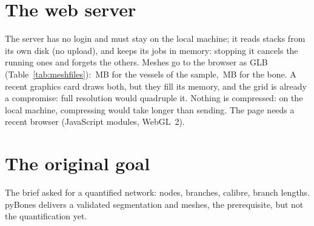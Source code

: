 \section{The web server}

The server has no login and must stay on the local machine; it reads stacks from its own disk (no
upload), and keeps its jobs in memory: stopping it cancels the running ones and forgets the others.
Meshes go to the browser as GLB (Table~\ref{tab:meshfiles}): \pbValueMeshVesselGlbMB\,MB for the
vessels of the sample, \pbValueMeshBoneGlbMB\,MB for the bone. A recent graphics card draws both, but
they fill its memory, and the \pbValueMeshGridUm\um{} grid is already a compromise: full resolution
would quadruple it. Nothing is compressed: on
the local machine, compressing would take longer than sending. The page needs a recent browser
(JavaScript modules, WebGL~2).

\section{The original goal}

The brief asked for a quantified network: nodes, branches, calibre, branch lengths. pyBones delivers a
validated segmentation and meshes, the prerequisite, but not the quantification yet.

